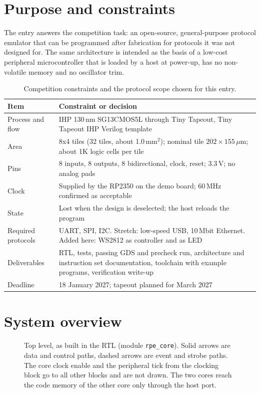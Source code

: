 \documentclass[10pt,a4paper]{article}
\begin{document}
\section{Purpose and constraints}

The entry answers the competition task: an open-source, general-purpose protocol emulator that can be programmed
after fabrication for protocols it was not designed for. The same architecture is intended as the basis of a
low-cost peripheral microcontroller that is loaded by a host at power-up, has no non-volatile memory and no
oscillator trim.

\begin{table}[!htb]
\centering\small
\begin{tabularx}{\linewidth}{@{}lL@{}}
\toprule
Item & Constraint or decision \\
\midrule
Process and flow & IHP 130\,nm SG13CMOS5L through Tiny Tapeout, Tiny Tapeout IHP Verilog template \\
Area & 8x4 tiles (32 tiles, about 1.0\,mm$^2$); nominal tile $202 \times 155\,\mu$m; about 1K logic cells per tile \\
Pins & 8 inputs, 8 outputs, 8 bidirectional, clock, reset; 3.3\,V; no analog pads \\
Clock & Supplied by the RP2350 on the demo board; 60\,MHz confirmed as acceptable \\
State & Lost when the design is deselected; the host reloads the program \\
Required protocols & UART, SPI, I2C. Stretch: low-speed USB, 10\,Mbit Ethernet. Added here: WS2812 as controller and as LED \\
Deliverables & RTL, tests, passing GDS and precheck run, architecture and instruction set documentation, toolchain with example programs, verification write-up \\
Deadline & 18 January 2027; tapeout planned for March 2027 \\
\bottomrule
\end{tabularx}
\caption{Competition constraints and the protocol scope chosen for this entry.}
\end{table}

\section{System overview}

\begin{figure}[!htb]
\centering
\resizebox{\textwidth}{!}{}
\caption{Top level, as built in the RTL (module \texttt{rpe\_core}). Solid arrows are data and control paths, dashed
arrows are event and strobe paths. The core clock enable and the peripheral tick from the clocking block go to
all other blocks and are not drawn. The two cores reach the code memory of the other core only through the host
port.}
\label{fig:block}
\end{figure}
\end{document}
